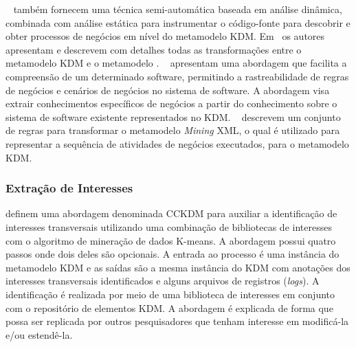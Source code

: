 ~ também fornecem uma técnica semi-automática baseada em análise dinâmica, combinada com análise estática para instrumentar o código-fonte para descobrir e obter processos de negócios em nível do metamodelo KDM. Em~\cite{Perez-Castillo:2010:IBP:1875847.1875861} os autores apresentam e descrevem com detalhes todas as transformações entre o metamodelo KDM e o metamodelo . ~ apresentam uma abordagem que facilita a compreensão de um determinado software, permitindo a rastreabilidade de regras de negócios e cenários de negócios no sistema de software. A abordagem visa extrair conhecimentos específicos de negócios a partir do conhecimento sobre o sistema de software existente representados no KDM. ~ descrevem um conjunto de regras para transformar o metamodelo \textit{Mining} XML, o qual é utilizado para representar a sequência de atividades de negócios executados, para o metamodelo KDM. 







\subsubsection{Extração de Interesses} %
\label{ssub:Concern Extracting}

 definem uma abordagem denominada CCKDM para auxiliar a identificação de interesses transversais utilizando uma combinação de bibliotecas de interesses com o algoritmo de mineração de dados K-means. A abordagem possui quatro passos onde dois deles são opcionais. A entrada ao processo é uma instância do metamodelo KDM e as saídas são a mesma instância do KDM com anotações dos interesses transversais identificados e alguns arquivos de registros (\textit{logs}). A identificação é realizada por meio de uma biblioteca de interesses em conjunto com o repositório de elementos KDM. A abordagem é explicada de forma que possa ser replicada por outros pesquisadores que tenham interesse em modificá-la e/ou estendê-la.

